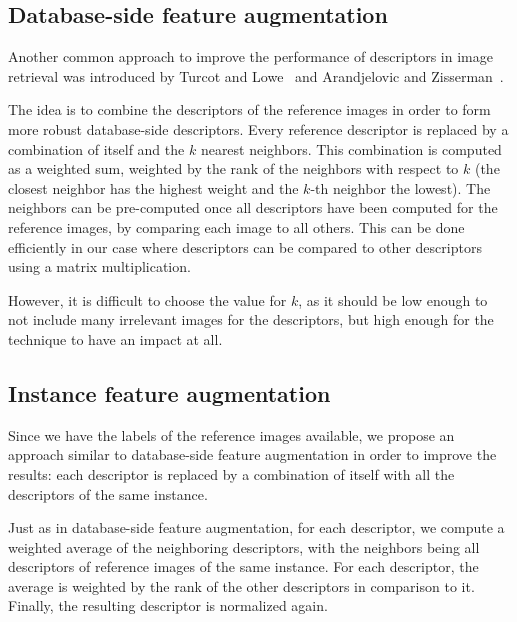 \subsection{Database-side feature augmentation}
Another common approach to improve the performance of descriptors
in image retrieval was introduced
by Turcot and Lowe~\cite{turcot_better_2009} and
Arandjelovic and Zisserman~\cite{arandjelovic_three_2012}.

The idea is to combine the descriptors of the reference
images in order to form more robust database-side descriptors.
Every reference descriptor is replaced by a
combination of itself and the $k$ nearest neighbors.
This combination is computed as a weighted sum, weighted
by the rank of the neighbors with respect to $k$ (the
closest neighbor has the highest weight and the $k$-th
neighbor the lowest).
The neighbors can be pre-computed once all descriptors
have been computed for the reference images, by comparing
each image to all others. This can be done efficiently
in our case where descriptors can be compared to other
descriptors using a matrix multiplication.

However, it is difficult to choose the value for $k$, as
it should be low enough to not include many irrelevant
images for the descriptors, but high enough for the
technique to have an impact at all.

\subsection{Instance feature augmentation}\label{sec:ifa}
Since we have the labels of the reference images
available, we propose an approach similar to
database-side feature augmentation in order to
improve the results: each descriptor is replaced by a
combination of itself with all the descriptors of the same instance.

Just as in database-side feature augmentation, for each descriptor,
we compute a weighted average of the neighboring descriptors, with the
neighbors being all descriptors of reference images of the same instance.
For each descriptor, the average is weighted by the rank of the other
descriptors in comparison to it. Finally, the resulting descriptor
is normalized again.
